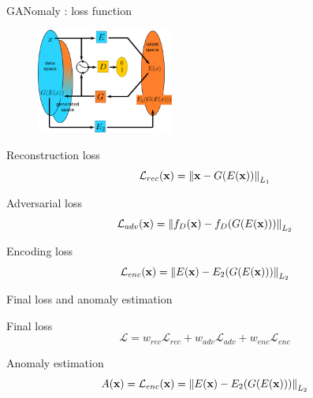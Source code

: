 \documentclass[xcolor=pdftex,dvipsnames,table,mathserif]{beamer}
\begin{document}
\begin{frame}{GANomaly : loss function}

  \begin{figure}[ht]
    \centering
    \includegraphics[width=0.4\textwidth]{ganomaly}
  \end{figure}

\small

  \begin{block}{Reconstruction loss}
    \[ \mathcal{L}_{rec}(\mathbf{x}) = \norm{\mathbf{x} - G(E(\mathbf{x}))}_{L_1} \]
  \end{block}

  \begin{block}{Adversarial loss}
    \[ \mathcal{L}_{adv}(\mathbf{x}) = \norm{f_D(\mathbf{x}) - f_D(G(E(\mathbf{x})))}_{L_2} \]
  \end{block}

  \begin{block}{Encoding loss}
    \[ \mathcal{L}_{enc}(\mathbf{x}) = \norm{E(\mathbf{x}) - E_2(G(E(\mathbf{x})))}_{L_2} \]
  \end{block}

\end{frame}


\begin{frame}{Final loss and anomaly estimation}

  \begin{block}{Final loss}
  \[\mathcal{L} = w_{rec}\mathcal{L}_{rec} + w_{adv}\mathcal{L}_{adv} + w_{enc}\mathcal{L}_{enc}\]
  \end{block}

  \begin{block}{Anomaly estimation}
    \[A(\mathbf{x}) = \mathcal{L}_{enc}(\mathbf{x}) = \norm{E(\mathbf{x}) - E_2(G(E(\mathbf{x})))}_{L_2} \]
  \end{block}
\end{frame}
\end{document}
